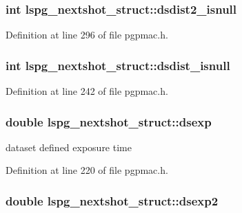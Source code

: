 \hypertarget{structlspg__nextshot__struct_a7fce65f4719a4a8110006f8b72eec3f7}{
\subsubsection[{dsdist2\-\_\-isnull}]{\setlength{\rightskip}{0pt plus 5cm}int lspg\-\_\-nextshot\-\_\-struct\-::dsdist2\-\_\-isnull}}\label{structlspg__nextshot__struct_a7fce65f4719a4a8110006f8b72eec3f7}


Definition at line 296 of file pgpmac.\-h.

\hypertarget{structlspg__nextshot__struct_ac6f2bdc7b023d933509bf74af7b169f9}{
\subsubsection[{dsdist\-\_\-isnull}]{\setlength{\rightskip}{0pt plus 5cm}int lspg\-\_\-nextshot\-\_\-struct\-::dsdist\-\_\-isnull}}\label{structlspg__nextshot__struct_ac6f2bdc7b023d933509bf74af7b169f9}


Definition at line 242 of file pgpmac.\-h.

\hypertarget{structlspg__nextshot__struct_a063e4c99201a763c2eb048acfc855efa}{
\subsubsection[{dsexp}]{\setlength{\rightskip}{0pt plus 5cm}double lspg\-\_\-nextshot\-\_\-struct\-::dsexp}}\label{structlspg__nextshot__struct_a063e4c99201a763c2eb048acfc855efa}


dataset defined exposure time 



Definition at line 220 of file pgpmac.\-h.

\hypertarget{structlspg__nextshot__struct_a4d8c34309572875352ddabe9cc9001ee}{
\subsubsection[{dsexp2}]{\setlength{\rightskip}{0pt plus 5cm}double lspg\-\_\-nextshot\-\_\-struct\-::dsexp2}}\label{structlspg__nextshot__struct_a4d8c34309572875352ddabe9cc9001ee}


